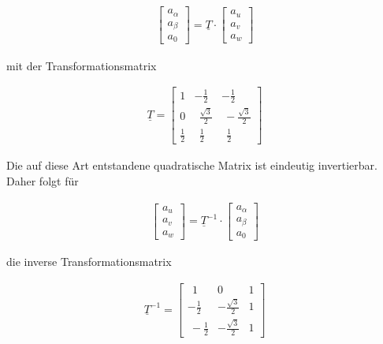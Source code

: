 \begin{align}
	\begin{bmatrix}
		a_{\alpha} \\
		a_{\beta} \\
		a_{0}
	\end{bmatrix}
	=\underline{T}\cdot 
	\begin{bmatrix}
		a_{u} \\
		a_{v} \\
		a_{w}
	\end{bmatrix}
	\label{clarkevektornull}
	\end{align}

mit der Transformationsmatrix

\begin{align}
	\underline{T} =
	\begin{bmatrix}
		1 & -\frac{1}{2} & -\frac{1}{2}  \\
		0 & ~~\frac{\sqrt{3}}{2} & ~-\frac{\sqrt{3}}{2} \\
		\frac{1}{2} & ~~\frac{1}{2} & ~~\frac{1}{2}
	\end{bmatrix}
	\label{clarkematrixnull}
\end{align} 

Die auf diese Art entstandene quadratische Matrix ist eindeutig invertierbar.
Daher folgt für

\begin{align}
	\begin{bmatrix}
	a_{u} \\
	a_{v} \\
	a_{w}
	\end{bmatrix}
	=\underline{T}^{-1}\cdot 
	\begin{bmatrix}
	a_{\alpha} \\
	a_{\beta} \\
	a_{0}
	\end{bmatrix}
	\label{inverseclarkevektornull}
\end{align}

die inverse Transformationsmatrix

\begin{align}
	\underline{T}^{-1} =
	\begin{bmatrix}
		~~1 & 0 & 1  \\
		-\frac{1}{2} & -\frac{\sqrt{3}}{2} & 1 \\
		~-\frac{1}{2} & -\frac{\sqrt{3}}{2} & 1
	\end{bmatrix}
	\label{inverseclarkematrixnull}
\end{align}

